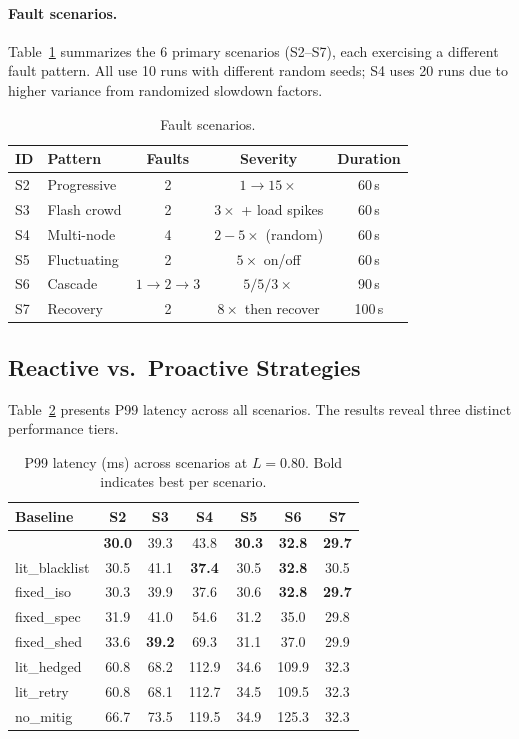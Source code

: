 \paragraph{Fault scenarios.}
Table~\ref{tab:scenarios} summarizes the 6 primary scenarios (S2--S7),
each exercising a different fault pattern. All use 10 runs with
different random seeds; S4 uses 20 runs due to higher variance from
randomized slowdown factors.

\begin{table}[t]
\centering
\caption{Fault scenarios.}
\label{tab:scenarios}
\small
\begin{tabular}{@{}llccc@{}}
\toprule
ID & Pattern & Faults & Severity & Duration \\
\midrule
S2 & Progressive & 2 & $1{\to}15\times$ & 60\,s \\
S3 & Flash crowd & 2 & $3\times$ + load spikes & 60\,s \\
S4 & Multi-node & 4 & $2{-}5\times$ (random) & 60\,s \\
S5 & Fluctuating & 2 & $5\times$ on/off & 60\,s \\
S6 & Cascade & $1{\to}2{\to}3$ & $5/5/3\times$ & 90\,s \\
S7 & Recovery & 2 & $8\times$ then recover & 100\,s \\
\bottomrule
\end{tabular}
\end{table}

\subsection{Reactive vs.\ Proactive Strategies}
\label{sec:eval-lit}
\label{sec:eval-tiers}

Table~\ref{tab:tiers} presents P99 latency across all scenarios. The
results reveal three distinct performance tiers.

\begin{table}[t]
\centering
\caption{P99 latency (ms) across scenarios at $L = 0.80$. Bold
  indicates best per scenario.}
\label{tab:tiers}
\footnotesize
\begin{tabular}{@{}lcccccc@{}}
\toprule
Baseline & S2 & S3 & S4 & S5 & S6 & S7 \\
\midrule
\system{} & \textbf{30.0} & 39.3 & 43.8 & \textbf{30.3} & \textbf{32.8} & \textbf{29.7} \\
lit\_blacklist & 30.5 & 41.1 & \textbf{37.4} & 30.5 & \textbf{32.8} & 30.5 \\
fixed\_iso & 30.3 & 39.9 & 37.6 & 30.6 & \textbf{32.8} & \textbf{29.7} \\
fixed\_spec & 31.9 & 41.0 & 54.6 & 31.2 & 35.0 & 29.8 \\
fixed\_shed & 33.6 & \textbf{39.2} & 69.3 & 31.1 & 37.0 & 29.9 \\
\midrule
lit\_hedged & 60.8 & 68.2 & 112.9 & 34.6 & 109.9 & 32.3 \\
lit\_retry & 60.8 & 68.1 & 112.7 & 34.5 & 109.5 & 32.3 \\
no\_mitig & 66.7 & 73.5 & 119.5 & 34.9 & 125.3 & 32.3 \\
\bottomrule
\end{tabular}
\end{table}

